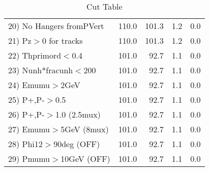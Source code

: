 \begin{table}[h!]
\begin{tabular}{||l||r|r|r|r||}
 20) No Hangers fromPVert &       110.0 &       101.3 &         1.2 &         0.0 \\
 21) Pz$>$0 for tracks    &       110.0 &       101.3 &         1.2 &         0.0 \\
 22) Thprimord$<$0.4      &       101.0 &        92.7 &         1.1 &         0.0 \\
 23) Nunh*fracunh$<$200   &       101.0 &        92.7 &         1.1 &         0.0 \\
 24) Emumu$>$2GeV         &       101.0 &        92.7 &         1.1 &         0.0 \\
 25) P+,P-$>$0.5          &       101.0 &        92.7 &         1.1 &         0.0 \\
 26) P+,P-$>$1.0 (2.5mux) &       101.0 &        92.7 &         1.1 &         0.0 \\
 27) Emumu$>$5GeV  (8mux) &       101.0 &        92.7 &         1.1 &         0.0 \\
 28) Phi12$>$90deg  (OFF) &       101.0 &        92.7 &         1.1 &         0.0 \\
 29) Pmumu$>$10GeV  (OFF) &       101.0 &        92.7 &         1.1 &         0.0 \\
 \hline
 \hline
 \end{tabular}
 \caption{Cut Table \cohpip }
 \label{tab-cut_copip}
 \end{table}
